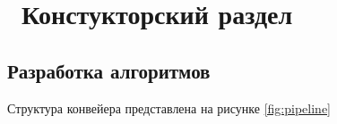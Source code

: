 \chapter{ Констукторский раздел}
\label{cha:design}
\section{ Разработка алгоритмов}

Структура конвейера представлена на рисунке \ref{fig:pipeline}

\begin{figure}[ht!]
\end{figure}
